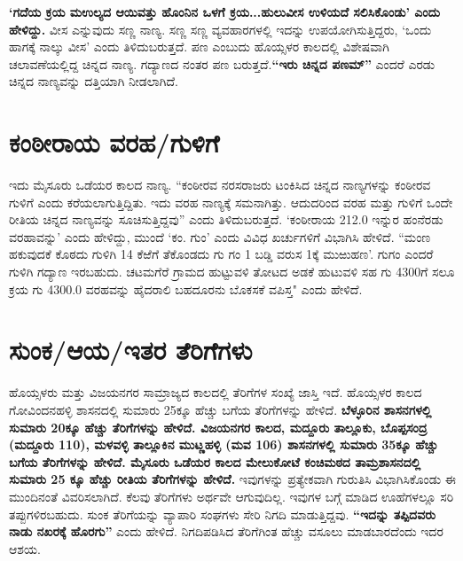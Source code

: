 \textbf{‘ಗದೆಯ ಕ್ರಯ ಮಉಲ್ಯದ ಆಯಿವತ್ತು ಹೊಂನಿನ ಒಳಗೆ ಕ್ರಯ...ಹುಲುವೀಸ ಉಳಿಯದೆ ಸಲಿಸಿಕೊಂಡು’ ಎಂದು ಹೇಳಿದ್ದು.} ವೀಸ ಎನ್ನುವುದು ಸಣ್ಣ ನಾಣ್ಯ. ಸಣ್ಣ ಸಣ್ಣ ವ್ಯವಹಾರಗಳಲ್ಲಿ ಇದನ್ನು ಉಪಯೋಗಿಸುತ್ತಿದ್ದರು, ‘ಒಂದು ಹಾಗಕ್ಕೆ ನಾಲ್ಕು ವೀಸ’ ಎಂದು ತಿಳಿದುಬರುತ್ತದೆ. ಪಣ ಎಂಬುದು ಹೊಯ್ಸಳರ ಕಾಲದಲ್ಲಿ ವಿಶೇಷವಾಗಿ ಚಲಾವಣೆಯಲ್ಲಿದ್ದ ಚಿನ್ನದ ನಾಣ್ಯ. ಗದ್ಯಾಣದ ನಂತರ ಪಣ ಬರುತ್ತದೆ.\textbf{“ಇರು ಚಿನ್ನದ ಪಣಮ್”} ಎಂದರೆ ಎರಡು ಚಿನ್ನದ ನಾಣ್ಯವನ್ನು ದತ್ತಿಯಾಗಿ ನೀಡಲಾಗಿದೆ.


\section{ಕಂಠೀರಾಯ ವರಹ/ಗುಳಿಗೆ}

ಇದು ಮೈಸೂರು ಒಡೆಯರ ಕಾಲದ ನಾಣ್ಯ. “ಕಂಠೀರವ ನರಸರಾಜರು ಟಂಕಿಸಿದ ಚಿನ್ನದ ನಾಣ್ಯಗಳನ್ನು ಕಂಠೀರವ ಗುಳಿಗೆ ಎಂದು ಕರೆಯಲಾಗುತ್ತಿದ್ದಿತು. ಇದು ವರಹ ನಾಣ್ಯಕ್ಕೆ ಸಮನಾಗಿತ್ತು. ಆದುದರಿಂದ ವರಹ ಮತ್ತು ಗುಳಿಗೆ ಒಂದೇ ರೀತಿಯ ಚಿನ್ನದ ನಾಣ್ಯವನ್ನು ಸೂಚಿಸುತ್ತಿದ್ದವು” ಎಂದು ತಿಳಿದುಬರುತ್ತದೆ. ‘ಕಂಠೀರಾಯ 212.0 ಇನ್ನುರ ಹಂನೆರಡು ವರಹಾವನ್ನು’ ಎಂದು ಹೇಳಿದ್ದು, ಮುಂದೆ ‘ಕಂ. ಗುಂ’ ಎಂದು ವಿವಿಧ ಖರ್ಚುಗಳಿಗೆ ವಿಭಾಗಿಸಿ ಹೇಳಿದೆ. “ಮಂಣ ಹಕುವುದಕೆ ಕೊಠದು ಗುಳಿಗಿ 14 ಕೆಱೆಗೆ ತೆಕೊಂಡದು ಗು ಗಂ 1 ಬಡ್ಡಿ ವರುಸ 1ಕ್ಕೆ ಮುಱುಹಣ’. ಗುಗಂ ಎಂದರೆ ಗುಳಿಗಿ ಗದ್ಯಾಣ ಇರಬಹುದು. ಚಟಮಗೆರೆ ಗ್ರಾಮದ ಹುಟ್ಟುವಳಿ ತೋಟದ ಅಡಕೆ ಹುಟುವಳಿ ಸಹ ಗು 4300ಗೆ ಸಲೂ ಕ್ರಯ ಗು 4300.0 ವರಹವನ್ನು ಹೈದರಾಲಿ ಬಹದೂರನು ಬೊಕಸಕೆ ವಪಿಸ್ತ" ಎಂದು ಹೇಳಿದೆ.

\newpage

\section{ಸುಂಕ/ಆಯ/ಇತರ ತೆರಿಗೆಗಳು}

ಹೊಯ್ಸಳರು ಮತ್ತು ವಿಜಯನಗರ ಸಾಮ್ರಾಜ್ಯದ ಕಾಲದಲ್ಲಿ ತೆರಿಗೆಗಳ ಸಂಖ್ಯೆ ಜಾಸ್ತಿ ಇದೆ. ಹೊಯ್ಸಳರ ಕಾಲದ ಗೋವಿಂದನಹಳ್ಳಿ ಶಾಸನದಲ್ಲಿ ಸುಮಾರು 25ಕ್ಕೂ ಹೆಚ್ಚು ಬಗೆಯ ತೆರಿಗೆಗಳನ್ನು ಹೇಳಿದೆ. \textbf{ಬೆಳ್ಳೂರಿನ ಶಾಸನಗಳಲ್ಲಿ ಸುಮಾರು 20ಕ್ಕೂ ಹೆಚ್ಚು ತೆರಿಗೆಗಳನ್ನು ಹೇಳಿದೆ. ವಿಜಯನಗರ ಕಾಲದ, ಮದ್ದೂರು ತಾಲ್ಲೂಕು, ಬೊಪ್ಪಸಂದ್ರ (ಮದ್ದೂರು 110), ಮಳವಳ್ಳಿ ತಾಲ್ಲೂಕಿನ ಮುಟ್ಣಹಳ್ಳಿ (ಮವ 106) ಶಾಸನಗಳಲ್ಲಿ ಸುಮಾರು 35ಕ್ಕೂ ಹೆಚ್ಚು ಬಗೆಯ ತೆರಿಗೆಗಳನ್ನು ಹೇಳಿದೆ. ಮೈಸೂರು ಒಡೆಯರ ಕಾಲದ ಮೇಲುಕೋಟೆ ಕಂಚಿಮಠದ ತಾಮ್ರಶಾಸನದಲ್ಲಿ ಸುಮಾರು 25 ಕ್ಕೂ ಹೆಚ್ಚು ರೀತಿಯ ತೆರಿಗೆಗಳನ್ನು ಹೇಳಿದೆ.} ಇವುಗಳನ್ನು ಪ್ರತ್ಯೇಕವಾಗಿ ಗುರುತಿಸಿ ವಿಭಾಗಿಸಿಕೊಂಡು ಈ ಮುಂದಿನಂತೆ ವಿವರಿಸಲಾಗಿದೆ. ಕೆಲವು ತೆರಿಗೆಗಳು ಅರ್ಥವೇ ಆಗುವುದಿಲ್ಲ. ಇವುಗಳ ಬಗ್ಗೆ ಮಾಡಿದ ಊಹೆಗಳಲ್ಲೂ ಸರಿ ತಪ್ಪುಗಳಿರಬಹುದು. ಸುಂಕ ತೆರಿಗೆಯನ್ನು ವ್ಯಾಪಾರಿ ಸಂಘಗಳು ಸೇರಿ ನಿಗದಿ ಮಾಡುತ್ತಿದ್ದವು. \textbf{“ಇದನ್ನು ತಪ್ಪಿದವರು ನಾಡು ನಖರಕ್ಕೆ ಹೊರಗು”} ಎಂದು ಹೇಳಿದೆ. ನಿಗದಿಪಡಿಸಿದ ತೆರಿಗೆಗಿಂತ ಹೆಚ್ಚು ವಸೂಲು ಮಾಡಬಾರದೆಂದು ಇದರ ಆಶಯ.

